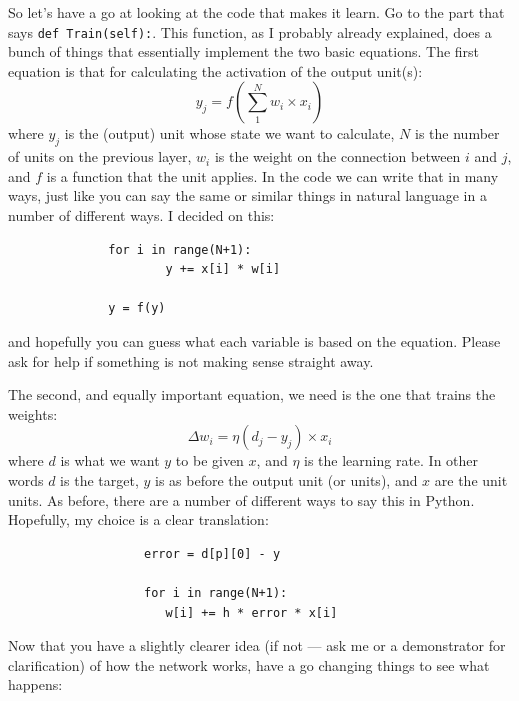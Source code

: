 \documentclass[a4paper,10pt]{article}
\begin{document}
So let's have a go at looking at the code that makes it learn. Go to the part that says \texttt{def Train(self):}. This function, as I probably already explained, does a bunch of things that essentially implement the two basic equations. The first equation is that for calculating the activation of the output unit(s): 
\begin{equation}
y_j = f \left( \sum_1^N w_i \times x_i \right)
\end{equation} 
where $y_j$ is the (output) unit whose state we want to calculate, $N$ is the number of units on the previous layer, $w_{i}$ is the weight on the connection between $i$ and $j$, and $f$ is a function that the unit applies. In the code we can write that in many ways, just like you can say the same or similar things in natural language in a number of different ways. I decided on this:      \begin{verbatim}
              for i in range(N+1): 
                      y += x[i] * w[i]
                      
              y = f(y)
\end{verbatim} and hopefully you can guess what each variable is based on the equation. Please ask for help if something is not making sense straight away.

The second, and equally important equation, we need is the one that trains the weights:
\begin{equation}
\Delta w_i = \eta  ( d_j - y_j ) \times x_{i}
\end{equation} 
where $d$ is what we want $y$ to be given $x$, and $\eta$ is the learning rate. In other words $d$ is the target, $y$ is as before the output unit (or units), and $x$ are the unit units. As before, there are a number of different ways to say this in Python. Hopefully, my choice is a clear translation:
\begin{verbatim}
                   error = d[p][0] - y
                   
                   for i in range(N+1): 
                      w[i] += h * error * x[i]\end{verbatim} 


Now that you have a slightly clearer idea (if not --- ask me or a demonstrator for clarification) of how the network works, have a go changing things to see what happens:
\end{document}
